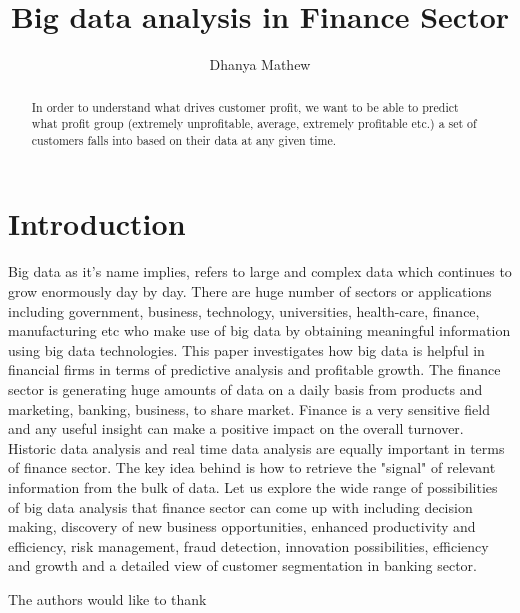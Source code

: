 \documentclass[sigconf]{acmart}
\begin{document}
\title{Big data analysis in Finance Sector}


\author{Dhanya Mathew}

\renewcommand{\shortauthors}{B. Trovato et al.}


\begin{abstract}
In order to understand what drives customer profit, we want to be able to predict what profit group (extremely unprofitable, average, extremely profitable etc.) a set of customers falls into based on their data at any given time.
\end{abstract}



\maketitle

\section{Introduction}

Big data as it's name implies, refers to large and complex data which continues to grow enormously day by day. There are huge number of sectors or applications including government, business, technology, universities, health-care, finance, manufacturing etc who make use of big data by obtaining meaningful information using big data technologies. This paper investigates how big data is helpful in financial firms in terms of predictive analysis and profitable growth. The finance sector is generating huge amounts of data on a daily basis from products and marketing, banking, business, to share market. Finance is a very sensitive field and any useful insight can make a positive impact on the overall turnover. Historic data analysis and real time data analysis are equally important in terms of finance sector. The key idea behind is how to retrieve the "signal" of relevant information from the bulk of data. Let us explore the wide range of possibilities of big data analysis that finance sector can come up with including decision making, discovery of new business opportunities, enhanced productivity and efficiency, risk management, fraud detection, innovation possibilities, efficiency and growth and a detailed view of customer segmentation in banking sector. 


\begin{acks}

  The authors would like to thank 

\end{acks}


 
\end{document}
